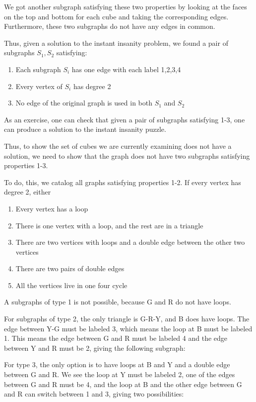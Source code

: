 \documentclass[]{article}
\providecommand{\tightlist}{%
  \setlength{\itemsep}{0pt}\setlength{\parskip}{0pt}}
\begin{document}
We got another subgraph satisfying these two properties by looking at
the faces on the top and bottom for each cube and taking the
corresponding edges. Furthermore, these two subgraphs do not have any
edges in common.

Thus, given a solution to the instant insanity problem, we found a pair
of subgraphs \(S_1, S_2\) satisfying:

\begin{enumerate}
\def\labelenumi{\arabic{enumi}.}
\tightlist
\item
  Each subgraph \(S_i\) has one edge with each label 1,2,3,4
\item
  Every vertex of \(S_i\) has degree 2
\item
  No edge of the original graph is used in both \(S_1\) and \(S_2\)
\end{enumerate}

As an exercise, one can check that given a pair of subgraphs satisfying
1-3, one can produce a solution to the instant insanity puzzle.

Thus, to show the set of cubes we are currently examining does not have
a solution, we need to show that the graph does not have two subgraphs
satisfying properties 1-3.

To do, this, we catalog all graphs satisfying properties 1-2. If every
vertex has degree 2, either

\begin{enumerate}
\def\labelenumi{\arabic{enumi}.}
\tightlist
\item
  Every vertex has a loop
\item
  There is one vertex with a loop, and the rest are in a triangle
\item
  There are two vertices with loops and a double edge between the other
  two vertices
\item
  There are two pairs of double edges
\item
  All the vertices live in one four cycle
\end{enumerate}

A subgraphs of type 1 is not possible, because G and R do not have
loops.

For subgraphs of type 2, the only triangle is G-R-Y, and B does have
loops. The edge between Y-G must be labeled 3, which means the loop at B
must be labeled 1. This means the edge between G and R must be labeled 4
and the edge between Y and R must be 2, giving the following subgraph:

For type 3, the only option is to have loops at B and Y and a double
edge between G and R. We see the loop at Y must be labeled 2, one of the
edges between G and R must be 4, and the loop at B and the other edge
between G and R can switch between 1 and 3, giving two possibilities:
\end{document}

